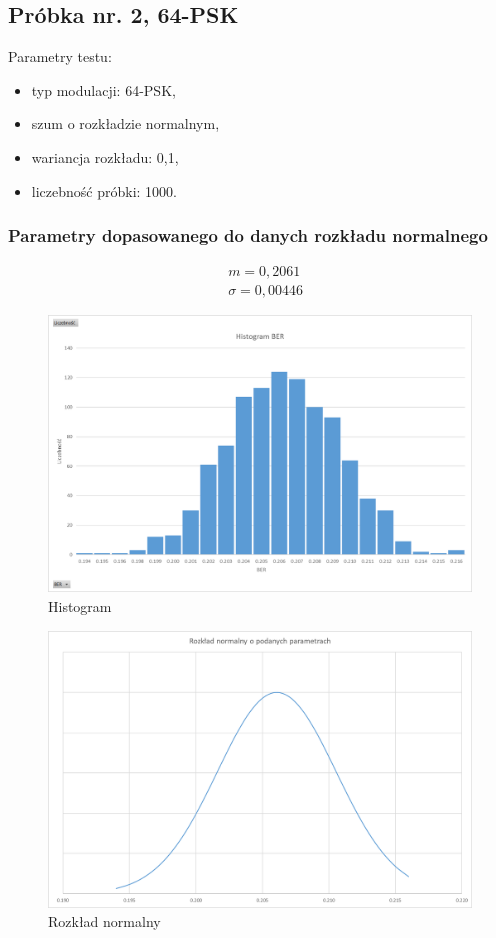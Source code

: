 \documentclass{article}
\begin{document}
	\newpage
	\subsection{Próbka nr. 2, 64-PSK}
		Parametry testu:
		\begin{itemize}
			\item typ modulacji: 64-PSK,
			\item szum o rozkładzie normalnym,
			\item wariancja rozkładu: 0,1,
			\item liczebność próbki: 1000.
		\end{itemize}
		
		\subsubsection{Parametry dopasowanego do danych rozkładu normalnego}
			\begin{align*}
				&m = 	0,2061\\
				&\sigma = 0,00446
			\end{align*}
		
			\begin{figure}[H]
				\centering
				\includegraphics[width=0.8\linewidth]{img/hist_64psk01.png}
				\caption{Histogram}
			\end{figure}
			\begin{figure}[H]
				\centering
				\includegraphics[width=0.8\linewidth]{img/rozk_64psk01.png}
				\caption{Rozkład normalny}
			\end{figure}
		
\end{document}
